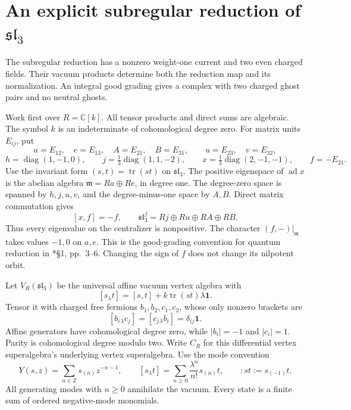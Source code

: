 \section{An explicit subregular reduction of \texorpdfstring{$\mathfrak{sl}_3$}{sl3}}
\label{sec:cbc27-subregular}

The subregular reduction has a nonzero weight-one current and two even charged fields.
Their vacuum products determine both the reduction map and its normalization.
An integral good grading gives a complex with two charged ghost pairs and no neutral ghosts.

Work first over $R=\mathbb C[k]$.
All tensor products and direct sums are algebraic.
The symbol $k$ is an indeterminate of cohomological degree zero.
For matrix units $E_{ij}$, put
\[
 a=E_{12},\quad e=E_{13},\quad A=E_{21},\quad B=E_{31},
 \qquad u=E_{23},\quad v=E_{32},
\]
\[
 h=\operatorname{diag}(1,-1,0),\qquad
 j=\tfrac13\operatorname{diag}(1,1,-2),\qquad
 x=\tfrac13\operatorname{diag}(2,-1,-1),\qquad f=-E_{21}.
\]
Use the invariant form $(s,t)=\operatorname{tr}(st)$ on $\mathfrak{sl}_3$.
The positive eigenspace of $\operatorname{ad}x$ is the abelian algebra
$\mathfrak m=Ra\oplus Re$, in degree one.
The degree-zero space is spanned by $h,j,u,v$, and the degree-minus-one space by $A,B$.
Direct matrix commutation gives
\[
 [x,f]=-f,\qquad
 \mathfrak{sl}_3^f=Rj\oplus Ru\oplus RA\oplus RB.
\]
Thus every eigenvalue on the centralizer is nonpositive.
The character $(f,-)|_{\mathfrak m}$ takes values $-1,0$ on $a,e$.
This is the good-grading convention for quantum reduction in
\cite{SubregularKW027}*{\S1, pp.~3--6}.
Changing the sign of $f$ does not change its nilpotent orbit.

Let $V_R(\mathfrak{sl}_3)$ be the universal affine vacuum vertex algebra with
\[
 [s_\lambda t]=[s,t]+k\operatorname{tr}(st)\lambda\mathbf1.
\]
Tensor it with charged free fermions $b_1,b_2,c_1,c_2$, whose only nonzero brackets are
\[
 [b_i{}_{\lambda}c_j]=[c_j{}_{\lambda}b_i]=\delta_{ij}\mathbf1.
\]
Affine generators have cohomological degree zero, while $|b_i|=-1$ and $|c_i|=1$.
Parity is cohomological degree modulo two.
Write $C_R$ for this differential vertex superalgebra's underlying vertex superalgebra.
Use the mode convention
\[
 Y(s,z)=\sum_{n\in\mathbb Z}s_{(n)}z^{-n-1},\qquad
 [s_\lambda t]=\sum_{n\geq0}\frac{\lambda^n}{n!}s_{(n)}t,
 \qquad :st:=s_{(-1)}t.
\]
All generating modes with $n\geq0$ annihilate the vacuum.
Every state is a finite sum of ordered negative-mode monomials.

